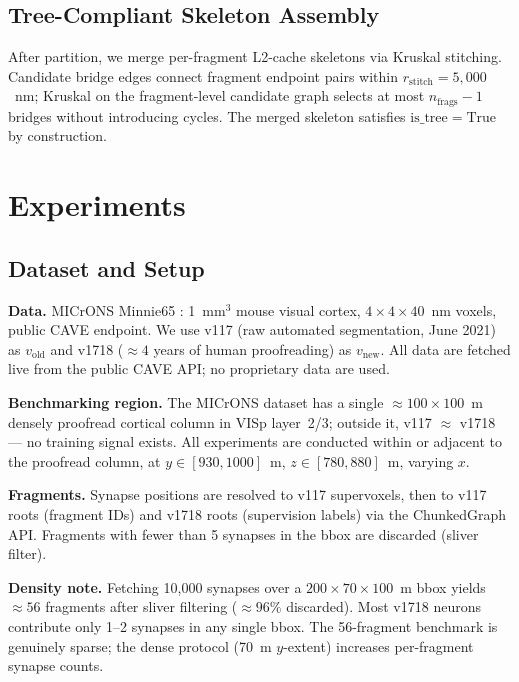 \documentclass[10pt,letterpaper]{article}
\begin{document}
\subsection{Tree-Compliant Skeleton Assembly}

After partition, we merge per-fragment L2-cache skeletons via Kruskal stitching. Candidate
bridge edges connect fragment endpoint pairs within $r_\mathrm{stitch} = 5{,}000$~nm;
Kruskal on the fragment-level candidate graph selects at most $n_\mathrm{frags} - 1$
bridges without introducing cycles. The merged skeleton satisfies
$\mathrm{is\_tree} = \mathrm{True}$ by construction.

\section{Experiments}

\subsection{Dataset and Setup}

\textbf{Data.} MICrONS Minnie65 \cite{microns2021}: 1~mm$^3$ mouse visual cortex,
$4 \times 4 \times 40$~nm voxels, public CAVE endpoint. We use v117 (raw automated
segmentation, June 2021) as $v_\text{old}$ and v1718 (${\approx}4$ years of human
proofreading) as $v_\text{new}$. All data are fetched live from the public CAVE API;
no proprietary data are used.

\textbf{Benchmarking region.} The MICrONS dataset has a single ${\approx}100 \times 100$~\textmu{}m
densely proofread cortical column in VISp layer~2/3; outside it, v117 $\approx$ v1718
--- no training signal exists. All experiments are conducted within or adjacent to the
proofread column, at $y \in [930, 1000]$~\textmu{}m, $z \in [780, 880]$~\textmu{}m, varying $x$.

\textbf{Fragments.} Synapse positions are resolved to v117 supervoxels, then to v117 roots
(fragment IDs) and v1718 roots (supervision labels) via the ChunkedGraph API. Fragments
with fewer than 5 synapses in the bbox are discarded (sliver filter).

\textbf{Density note.} Fetching 10,000 synapses over a $200 \times 70 \times 100$~\textmu{}m
bbox yields ${\approx}56$ fragments after sliver filtering (${\approx}96\%$ discarded).
Most v1718 neurons contribute only 1--2 synapses in any single bbox. The 56-fragment
benchmark is genuinely sparse; the dense protocol (70~\textmu{}m $y$-extent) increases
per-fragment synapse counts.
\end{document}
